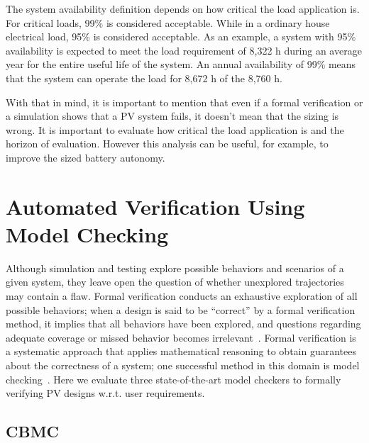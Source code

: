\documentclass[review]{elsarticle}
\begin{document}
The system availability definition depends on how critical the load application is. For critical loads, 99\% is considered acceptable. While in a ordinary house electrical load, 95\% is considered acceptable. As an example, a system with 95\% availability is expected to meet the load requirement of 8,322 h during an average year for the entire useful life of the system. An annual availability of 99\% means that the system can operate the load for 8,672 h of the 8,760 h.

With that in mind, it is important to mention that even if a formal verification or a simulation shows that a PV system fails, it doesn't mean that the sizing is wrong. It is important to evaluate how critical the load application is and the horizon of evaluation. However this analysis can be useful, for example, to improve the sized battery autonomy.
%
\section{Automated Verification Using Model Checking}
\label{sec:AutomatedVerification}
Although simulation and testing explore possible behaviors and scenarios of a given system, they leave open the question of whether unexplored trajectories may contain a flaw. Formal verification conducts an exhaustive exploration of all possible behaviors; when a design is said to be ``correct'' by a formal verification method, it implies that all behaviors have been explored, and questions regarding adequate coverage or missed behavior becomes irrelevant~\cite{Clarke2012}. Formal verification is a systematic approach that applies mathematical reasoning to obtain guarantees about the correctness of a system; one successful method in this domain is model checking~\cite{Clarke2012}. Here we evaluate three state-of-the-art model checkers to formally verifying PV designs w.r.t. user requirements.

\subsection{CBMC}
\end{document}
